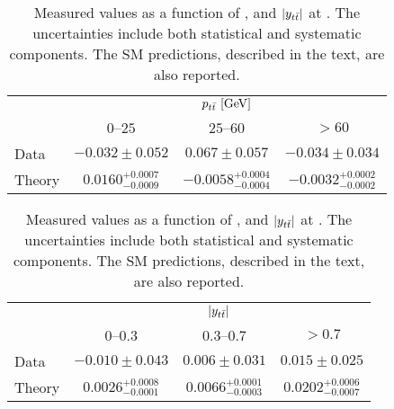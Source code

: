 \begin{table}[!htp]\centering
{}
\begin{tabular}{l c c c }
  \toprule
  &\multicolumn{3}{c}{$p_{t\bar{t}}{}~[\rm{GeV}]$}    \\
  \ac{} &     $0$--$25$           &        $25$--$60$         &  $>60$            \\
  \midrule
  Data  &    $-0.032\pm0.052$       &     $0.067\pm0.057$       &      $-0.034\pm0.034$     \\
  Theory & $0.0160^{+0.0007}_{-0.0009}$ & $-0.0058^{+0.0004}_{-0.0004}$ & $-0.0032^{+0.0002}_{-0.0002}$  \\
  \bottomrule
\end{tabular}
\begin{tabular}{l c c c }
  \toprule
  &\multicolumn{3}{c}{$|y_{t\bar{t}}{}|$}    \\
  \ac{}  &     $0$--$0.3$          &        $0.3$--$0.7$     &  $>0.7$            \\
  \midrule
  Data  &    $-0.010\pm0.043$       &     $0.006\pm0.031$     &      $0.015\pm0.025$     \\
  Theory & $0.0026^{+0.0008}_{-0.0001}$ & $0.0066^{+0.0001}_{-0.0003}$ & $0.0202^{+0.0006}_{-0.0007}$ \\
  \bottomrule
\end{tabular}
\label{tab:results7tev}
\caption{Measured \ac{} values as a function of \mtt{}, \pttt{} and
  $|y_{t\bar{t}}{}|$ at \seventev{}. The uncertainties include both statistical and
  systematic components. The SM predictions, described in the text,
  are also reported.} 
\end{table}
